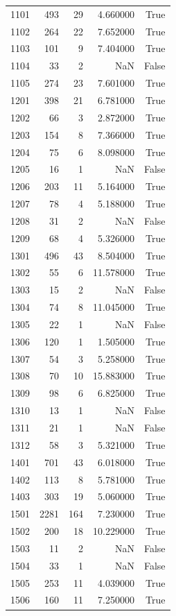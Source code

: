 \begin{longtable}{lrrrr}
1101 & 493 & 29 & 4.660000 & True \\
1102 & 264 & 22 & 7.652000 & True \\
1103 & 101 & 9 & 7.404000 & True \\
1104 & 33 & 2 & NaN & False \\
1105 & 274 & 23 & 7.601000 & True \\
1201 & 398 & 21 & 6.781000 & True \\
1202 & 66 & 3 & 2.872000 & True \\
1203 & 154 & 8 & 7.366000 & True \\
1204 & 75 & 6 & 8.098000 & True \\
1205 & 16 & 1 & NaN & False \\
1206 & 203 & 11 & 5.164000 & True \\
1207 & 78 & 4 & 5.188000 & True \\
1208 & 31 & 2 & NaN & False \\
1209 & 68 & 4 & 5.326000 & True \\
1301 & 496 & 43 & 8.504000 & True \\
1302 & 55 & 6 & 11.578000 & True \\
1303 & 15 & 2 & NaN & False \\
1304 & 74 & 8 & 11.045000 & True \\
1305 & 22 & 1 & NaN & False \\
1306 & 120 & 1 & 1.505000 & True \\
1307 & 54 & 3 & 5.258000 & True \\
1308 & 70 & 10 & 15.883000 & True \\
1309 & 98 & 6 & 6.825000 & True \\
1310 & 13 & 1 & NaN & False \\
1311 & 21 & 1 & NaN & False \\
1312 & 58 & 3 & 5.321000 & True \\
1401 & 701 & 43 & 6.018000 & True \\
1402 & 113 & 8 & 5.781000 & True \\
1403 & 303 & 19 & 5.060000 & True \\
1501 & 2281 & 164 & 7.230000 & True \\
1502 & 200 & 18 & 10.229000 & True \\
1503 & 11 & 2 & NaN & False \\
1504 & 33 & 1 & NaN & False \\
1505 & 253 & 11 & 4.039000 & True \\
1506 & 160 & 11 & 7.250000 & True \\

\end{longtable}
